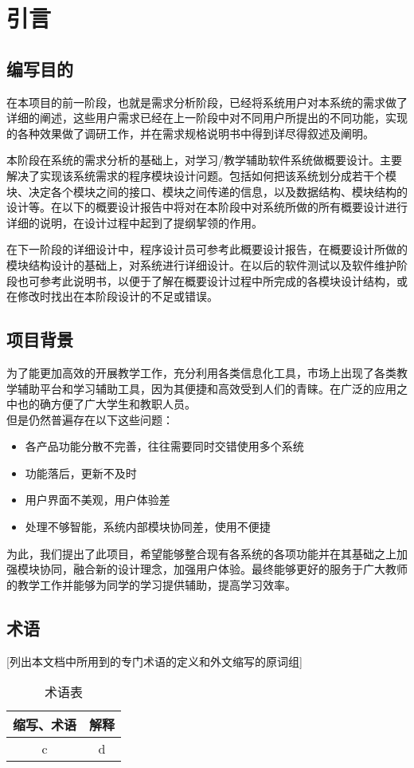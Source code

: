 \chapter{引言}
\section{编写目的}
在本项目的前一阶段，也就是需求分析阶段，已经将系统用户对本系统的需求做了详细的阐述，这些用户需求已经在上一阶段中对不同用户所提出的不同功能，实现的各种效果做了调研工作，并在需求规格说明书中得到详尽得叙述及阐明。

本阶段在系统的需求分析的基础上，对学习/教学辅助软件系统做概要设计。主要解决了实现该系统需求的程序模块设计问题。包括如何把该系统划分成若干个模块、决定各个模块之间的接口、模块之间传递的信息，以及数据结构、模块结构的设计等。在以下的概要设计报告中将对在本阶段中对系统所做的所有概要设计进行详细的说明，在设计过程中起到了提纲挈领的作用。

在下一阶段的详细设计中，程序设计员可参考此概要设计报告，在概要设计所做的模块结构设计的基础上，对系统进行详细设计。在以后的软件测试以及软件维护阶段也可参考此说明书，以便于了解在概要设计过程中所完成的各模块设计结构，或在修改时找出在本阶段设计的不足或错误。


\section{项目背景}
为了能更加高效的开展教学工作，充分利用各类信息化工具，市场上出现了各类教学辅助平台和学习辅助工具，因为其便捷和高效受到人们的青睐。在广泛的应用之中也的确方便了广大学生和教职人员。\\
但是仍然普遍存在以下这些问题：\\
\begin{itemize}
  \item 各产品功能分散不完善，往往需要同时交错使用多个系统
  \item 功能落后，更新不及时
  \item 用户界面不美观，用户体验差
  \item 处理不够智能，系统内部模块协同差，使用不便捷
\end{itemize}
为此，我们提出了此项目，希望能够整合现有各系统的各项功能并在其基础之上加强模块协同，融合新的设计理念，加强用户体验。最终能够更好的服务于广大教师的教学工作并能够为同学的学习提供辅助，提高学习效率。


\section{术语}
[列出本文档中所用到的专门术语的定义和外文缩写的原词组]
\begin{table}[htbp]
\centering
\caption{术语表} \label{tab:terminology}
\begin{tabular}{|c|c|}
    \hline
    缩写、术语 & 解释 \\
    \hline
    c & d \\
    \hline
\end{tabular}
\end{table}
